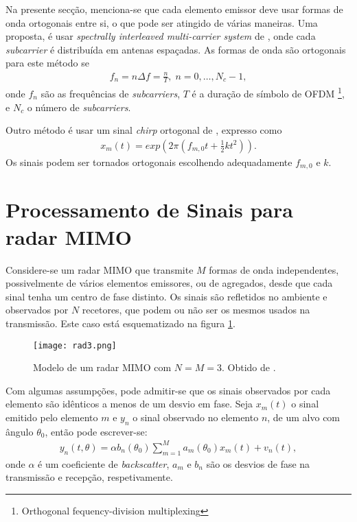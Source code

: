 \documentclass[purist,portuguese]{ist-report}
\begin{document}
Na presente secção, menciona-se que cada elemento emissor deve usar formas de onda ortogonais entre si, o que pode ser atingido de várias maneiras.
Uma proposta, é usar \textit{spectrally interleaved multi-carrier system} de \cite{sturm2013spectrally}, onde cada \textit{subcarrier} é distribuída em antenas espaçadas.
As formas de onda são ortogonais para este método se 
\begin{align}
  f_n = n\Delta f = \frac{n}{T}, \; n=0,\ldots,N_c -1,
  \label{eq:orth}
\end{align}
onde $f_n$ são as frequências de \textit{subcarriers}, $T$ é a duração de símbolo de OFDM \footnote{Orthogonal fequency-division multiplexing}, e $N_c$ o número de \textit{subcarriers}.

Outro método é usar um sinal \textit{chirp} ortogonal de \cite{chen2008mimo}, expresso como
\begin{align}
  x_m(t)= exp\left( 2\pi \left( f_{m,0}t+\frac{1}{2}kt^2 \right) \right).
  \label{eq:chirp}
\end{align}
Os sinais podem ser tornados ortogonais escolhendo adequadamente $f_{m,0}$ e $k$.


\section{Processamento de Sinais para radar MIMO}

Considere-se um radar MIMO que transmite $M$ formas de onda independentes, possivelmente de vários elementos emissores, ou de agregados, desde que cada sinal tenha um centro de fase distinto.
Os sinais são refletidos no ambiente e observados por $N$ recetores, que podem ou não ser os mesmos usados na transmissão.
Este caso está esquematizado na figura \ref{fig:rad3}.

\begin{figure}[hp]
  \centering
  \texttt{[image: rad3.png]}
  \caption{Modelo de um radar MIMO com $N=M=3$. Obtido de \cite{davis2015mimo}.}
  \label{fig:rad3}
\end{figure}

Com algumas assumpções, pode admitir-se que os sinais observados por cada elemento são idênticos a menos de um desvio em fase.
Seja $x_m(t)$ o sinal emitido pelo elemento $m$ e $y_n$ o sinal observado no elemento $n$, de um alvo com ângulo $\theta_0$, então pode escrever-se:
\begin{align}
  y_n(t,\theta) = \alpha b_n(\theta_0) \sum_{m=1}^{M}a_m(\theta_0)x_m(t) + v_n(t),
  \label{eq:proc1}
\end{align}
onde $\alpha$ é um coeficiente de \textit{backscatter}, $a_m$ e $b_n$ são os desvios de fase na transmissão e recepção, respetivamente.
\end{document}
